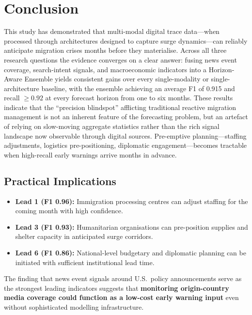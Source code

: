 \documentclass[11pt, a4paper]{article}
\begin{document}
\section{Conclusion}

This study has demonstrated that multi-modal digital trace data---when processed
through architectures designed to capture surge dynamics---can reliably anticipate
migration crises months before they materialise.  Across all three research questions
the evidence converges on a clear answer: fusing news event coverage, search-intent
signals, and macroeconomic indicators into a Horizon-Aware Ensemble yields consistent
gains over every single-modality or single-architecture baseline, with the ensemble
achieving an average F1 of 0.915 and recall $\geq 0.92$ at every forecast horizon
from one to six months.  These results indicate that the ``precision blindspot''
afflicting traditional reactive migration management is not an inherent feature of the
forecasting problem, but an artefact of relying on slow-moving aggregate statistics
rather than the rich signal landscape now observable through digital sources.
Pre-emptive planning---staffing adjustments, logistics pre-positioning, diplomatic
engagement---becomes tractable when high-recall early warnings arrive months in advance.

\subsection{Practical Implications}

\begin{itemize}
  \item \textbf{Lead 1 (F1 0.96):} Immigration processing centres can adjust staffing
        for the coming month with high confidence.
  \item \textbf{Lead 3 (F1 0.93):} Humanitarian organisations can pre-position
        supplies and shelter capacity in anticipated surge corridors.
  \item \textbf{Lead 6 (F1 0.86):} National-level budgetary and diplomatic planning
        can be initiated with sufficient institutional lead time.
\end{itemize}

The finding that news event signals around U.S.\ policy announcements serve as the
strongest leading indicators suggests that \textbf{monitoring origin-country media
coverage could function as a low-cost early warning input} even without sophisticated
modelling infrastructure.
\end{document}
